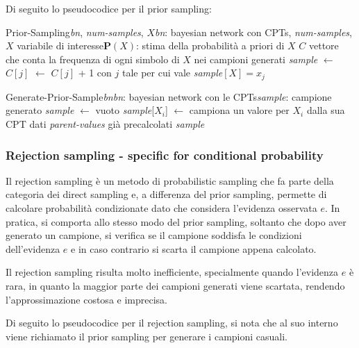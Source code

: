 Di seguito lo pseudocodice per il prior sampling:

\begin{algo}{Prior-Sampling}{\textit{bn}, \textit{num-samples}, $X$}{\textit{bn}: bayesian network con CPTs, \textit{num-samples}, $X$ variabile di interesse}{$\textbf{P}(X)$: stima della probabilità a priori di \(X\)}
	\State $C$ vettore che conta la frequenza di ogni simbolo di $X$ nei campioni generati 
		\State \textit{sample} $\leftarrow$ 
		\State $C[j]$ $\leftarrow$ $C[j]$ + 1 con $j$ tale per cui vale \textit{sample}$[X] = x_j$
	\EndFor
	\State \Return {} 
\end{algo}

\begin{algo}{Generate-Prior-Sample}{\textit{bn}}{\textit{bn}: bayesian network con le CPTs}{\textit{sample}: campione generato}
	\State \textit{sample} $\leftarrow$ vuoto
		\State \textit{sample}[$X_i$] $\leftarrow$ campiona un valore per $X_i$ dalla sua CPT dati \textit{parent-values} già precalcolati
	\EndFor
	\State \Return \textit{sample}
\end{algo}

\subsubsection*{Rejection sampling - specific for conditional probability}
Il rejection sampling è un metodo di probabilistic sampling che fa parte della categoria dei direct sampling e, a differenza
del prior sampling, permette di calcolare probabilità condizionate dato che considera l'evidenza osservata \(e\). In pratica,
si comporta allo stesso modo del prior sampling, soltanto che dopo aver generato un campione, si verifica se il campione soddisfa
le condizioni dell'evidenza \(e\) e in caso contrario si scarta il campione appena calcolato.

Il rejection sampling risulta molto inefficiente, specialmente quando l'evidenza \(e\) è rara, in quanto la maggior parte dei
campioni generati viene scartata, rendendo l'approssimazione costosa e imprecisa.

Di seguito lo pseudocodice per il rejection sampling, si nota che al suo interno viene richiamato il prior sampling per generare
i campioni casuali.

